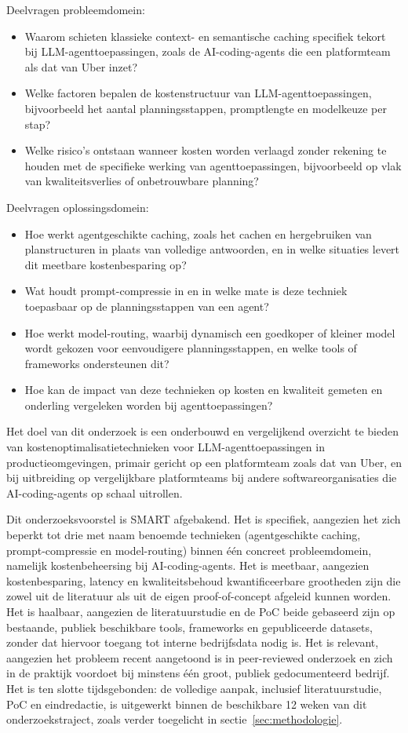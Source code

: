 \documentclass{hogent-article}
\begin{document}
Deelvragen probleemdomein:
\begin{itemize}
  \item Waarom schieten klassieke context- en semantische caching specifiek tekort bij LLM-agenttoepassingen, zoals de AI-coding-agents die een platformteam als dat van Uber inzet?
  \item Welke factoren bepalen de kostenstructuur van LLM-agenttoepassingen, bijvoorbeeld het aantal planningsstappen, promptlengte en modelkeuze per stap?
  \item Welke risico's ontstaan wanneer kosten worden verlaagd zonder rekening te houden met de specifieke werking van agenttoepassingen, bijvoorbeeld op vlak van kwaliteitsverlies of onbetrouwbare planning?
\end{itemize}

Deelvragen oplossingsdomein:
\begin{itemize}
  \item Hoe werkt agentgeschikte caching, zoals het cachen en hergebruiken van planstructuren in plaats van volledige antwoorden, en in welke situaties levert dit meetbare kostenbesparing op?
  \item Wat houdt prompt-compressie in en in welke mate is deze techniek toepasbaar op de planningsstappen van een agent?
  \item Hoe werkt model-routing, waarbij dynamisch een goedkoper of kleiner model wordt gekozen voor eenvoudigere planningsstappen, en welke tools of frameworks ondersteunen dit?
  \item Hoe kan de impact van deze technieken op kosten en kwaliteit gemeten en onderling vergeleken worden bij agenttoepassingen?
\end{itemize}

Het doel van dit onderzoek is een onderbouwd en vergelijkend overzicht te bieden van kostenoptimalisatietechnieken voor LLM-agenttoepassingen in productieomgevingen, primair gericht op een platformteam zoals dat van Uber, en bij uitbreiding op vergelijkbare platformteams bij andere softwareorganisaties die AI-coding-agents op schaal uitrollen.

Dit onderzoeksvoorstel is SMART afgebakend. Het is specifiek, aangezien het zich beperkt tot drie met naam benoemde technieken (agentgeschikte caching, prompt-compressie en model-routing) binnen één concreet probleemdomein, namelijk kostenbeheersing bij AI-coding-agents. Het is meetbaar, aangezien kostenbesparing, latency en kwaliteitsbehoud kwantificeerbare grootheden zijn die zowel uit de literatuur als uit de eigen proof-of-concept afgeleid kunnen worden. Het is haalbaar, aangezien de literatuurstudie en de PoC beide gebaseerd zijn op bestaande, publiek beschikbare tools, frameworks en gepubliceerde datasets, zonder dat hiervoor toegang tot interne bedrijfsdata nodig is. Het is relevant, aangezien het probleem recent aangetoond is in peer-reviewed onderzoek en zich in de praktijk voordoet bij minstens één groot, publiek gedocumenteerd bedrijf. Het is ten slotte tijdsgebonden: de volledige aanpak, inclusief literatuurstudie, PoC en eindredactie, is uitgewerkt binnen de beschikbare 12 weken van dit onderzoekstraject, zoals verder toegelicht in sectie~\ref{sec:methodologie}.
\end{document}
